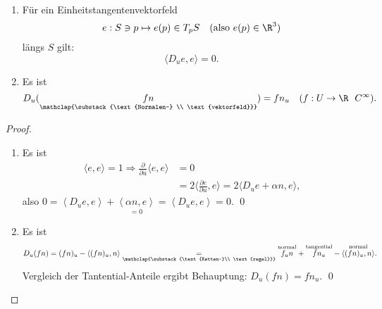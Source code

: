 \begin{lemma}
  \
  \begin{enumerate}
    \item Für ein Einheitstangentenvektorfeld
    \begin{equation*}
      e: S \ni p \mapsto e(p) \in T_pS \quad (\text{also } e(p) \in \R^3)
    \end{equation*}
    längs $ S $ gilt:
    \begin{equation*}
      \langle D_ue, e \rangle = 0\text{.}
    \end{equation*}

    \item Es ist
    \begin{equation*}
      D_u(\underset{\mathclap{\substack{\text{Normalen-} \\ \text{vektorfeld}}}}{fn}) = fn_u \quad (f: U \to \R \ \ C^\infty)\text{.}
    \end{equation*}
  \end{enumerate}
  \begin{proof}
    \ 
    \begin{enumerate}
      \item Es ist
      \begin{align*}
        \langle e, e \rangle = 1 \Rightarrow \frac{\partial}{\partial u}\langle e, e \rangle &= 0 \\
          &= 2\langle \frac{\partial e}{\partial u}, e \rangle = 2\langle D_ue + \alpha n, e \rangle\text{,}
      \end{align*} 
      also $ 0 = \left\langle D_ue,e \right\rangle + \underset{=0}{\left\langle \alpha n, e \right\rangle} = \left\langle D_ue,e \right\rangle = 0 $. \qed

      \item Es ist
      \begin{equation*}
        D_u(fn) = (fn)_u - \left\langle (fn)_u, n \right\rangle \underset{\mathclap{\substack{\text{Ketten-}\\ \text{regel}}}}{=} \overset{\text{normal}}{f_un} + \overset{\text{tangential}}{fn_u} - \overset{\text{normal}}{\left\langle (fn)_u, n \right\rangle}\text{.}
      \end{equation*}
      Vergleich der Tantential-Anteile ergibt Behauptung: $ D_u(fn) = fn_u $. \qed
    \end{enumerate}
  \end{proof}
\end{lemma}

